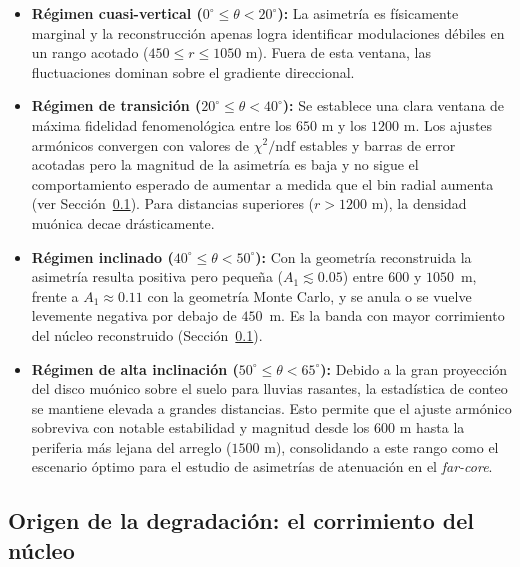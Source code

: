\begin{itemize}
	\item \textbf{Régimen cuasi-vertical ($0^\circ \le \theta < 20^\circ$):} La asimetría es físicamente marginal y la reconstrucción apenas logra identificar modulaciones débiles en un rango acotado ($450 \le r \le 1050\text{ m}$). Fuera de esta ventana, las fluctuaciones dominan sobre el gradiente direccional.
	
	\item \textbf{Régimen de transición ($20^\circ \le \theta < 40^\circ$):} Se establece una clara ventana de máxima fidelidad fenomenológica entre los $650\text{ m}$ y los $1200\text{ m}$. Los ajustes armónicos convergen con valores de $\chi^2/\mathrm{ndf}$ estables y barras de error acotadas pero la magnitud de la asimetría es baja y no sigue el comportamiento esperado de aumentar a medida que el bin radial aumenta (ver Sección~\ref{subsec:lavado_nucleo}). Para distancias superiores ($r > 1200\text{ m}$), la densidad muónica decae drásticamente.
	
	\item \textbf{Régimen inclinado ($40^\circ \le \theta < 50^\circ$):} Con la geometría reconstruida la asimetría resulta positiva pero pequeña ($A_1 \lesssim 0.05$) entre $600$ y $1050$~m, frente a $A_1 \approx 0.11$ con la geometría Monte Carlo, y se anula o se vuelve levemente negativa por debajo de $450$~m. Es la banda con mayor corrimiento del núcleo reconstruido (Sección~\ref{subsec:lavado_nucleo}).

	\item \textbf{Régimen de alta inclinación ($50^\circ \le \theta < 65^\circ$):} Debido a la gran proyección del disco muónico sobre el suelo para lluvias rasantes, la estadística de conteo se mantiene elevada a grandes distancias. Esto permite que el ajuste armónico sobreviva con notable estabilidad y magnitud desde los $600\text{ m}$ hasta la periferia más lejana del arreglo ($1500\text{ m}$), consolidando a este rango como el escenario óptimo para el estudio de asimetrías de atenuación en el \textit{far-core}.
\end{itemize}

\subsection{Origen de la degradación: el corrimiento del núcleo}
\label{subsec:lavado_nucleo}

